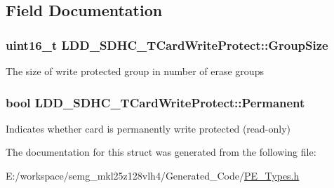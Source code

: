 \subsection{Field Documentation}
\hypertarget{struct_l_d_d___s_d_h_c___t_card_write_protect_ae05b5dd538cf47f5ec24559246415306}{
\subsubsection[{Group\-Size}]{\setlength{\rightskip}{0pt plus 5cm}uint16\-\_\-t L\-D\-D\-\_\-\-S\-D\-H\-C\-\_\-\-T\-Card\-Write\-Protect\-::\-Group\-Size}}\label{struct_l_d_d___s_d_h_c___t_card_write_protect_ae05b5dd538cf47f5ec24559246415306}
The size of write protected group in number of erase groups \hypertarget{struct_l_d_d___s_d_h_c___t_card_write_protect_aff6b0178087c770234bd68974d643552}{
\subsubsection[{Permanent}]{\setlength{\rightskip}{0pt plus 5cm}bool L\-D\-D\-\_\-\-S\-D\-H\-C\-\_\-\-T\-Card\-Write\-Protect\-::\-Permanent}}\label{struct_l_d_d___s_d_h_c___t_card_write_protect_aff6b0178087c770234bd68974d643552}
Indicates whether card is permanently write protected (read-\/only) 

The documentation for this struct was generated from the following file\-:\begin{DoxyCompactItemize}
\item 
E\-:/workspace/semg\-\_\-mkl25z128vlh4/\-Generated\-\_\-\-Code/\hyperlink{_p_e___types_8h}{P\-E\-\_\-\-Types.\-h}\end{DoxyCompactItemize}
